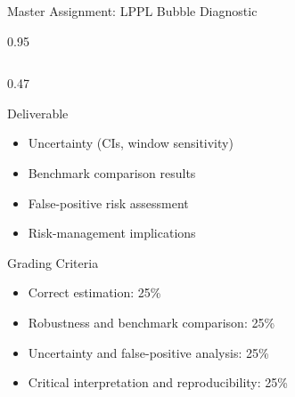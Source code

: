 \documentclass[9pt, aspectratio=169, t]{beamer}
\begin{document}
\begin{frame}{Master Assignment: LPPL Bubble Diagnostic}
\begin{cminipage}{0.95\textwidth}
{\begin{columns}[T]
\begin{column}{0.47\textwidth}
\begin{alertblock}{Deliverable}
\begin{itemize}
\begin{itemize}
                        \item Uncertainty (CIs, window sensitivity)
                        \item Benchmark comparison results
                        \item False-positive risk assessment
                        \item Risk-management implications
                    \end{itemize}
                \end{itemize}
            \end{alertblock}
            \vspace{-2mm}
            \begin{block}{Grading Criteria}
                \begin{itemize}\setlength{\itemsep}{0pt}
                    \item Correct estimation: 25\%
                    \item Robustness and benchmark comparison: 25\%
                    \item Uncertainty and false-positive analysis: 25\%
                    \item Critical interpretation and reproducibility: 25\%
                \end{itemize}
            \end{block}
        \end{column}
    \end{columns}
    }
    \end{cminipage}
\end{frame}
\end{document}
